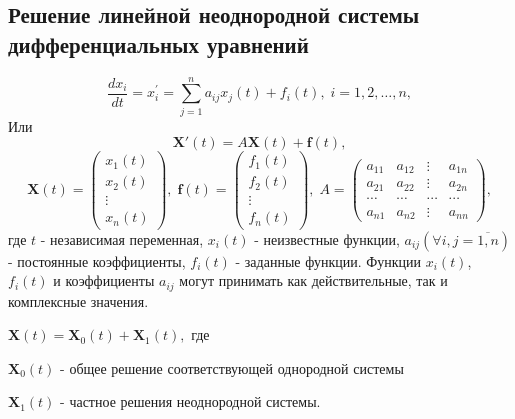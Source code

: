 \documentclass[a5paper,10pt]{article}
\begin{document}
		\subsection{Решение линейной неоднородной системы дифференциальных уравнений}
			$$ \frac{dx_i}{dt} = x^{\prime}_i = \sum\limits_{j=1}^n a_{ij}x_j(t) + f_i(t), \; i = 1,2,\ldots,n, $$
			Или
			$$ \mathbf{X}'\left( t \right) = A\mathbf{X}\left( t \right) + \mathbf{f}\left( t \right), $$
			\begin{equation}
				\mathbf{X}\left( t \right) = \left(
					\begin{array}{*{20}{c}}
						{{x_1}\left( t \right)}\\
						{{x_2}\left( t \right)}\\
						 \vdots \\
						{{x_n}\left( t \right)}
					\end{array}
				\right), \;
				\mathbf{f}\left( t \right) = \left(
					\begin{array}{*{20}{c}}
						{{f_1}\left( t \right)}\\
						{{f_2}\left( t \right)}\\
						 \vdots \\
						{{f_n}\left( t \right)}
					\end{array}
				\right), \;
				A = \left(
					\begin{array}{*{20}{c}}
						{{a_{11}}}&{{a_{12}}}& \vdots &{{a_{1n}}}\\
						{{a_{21}}}&{{a_{22}}}& \vdots &{{a_{2n}}}\\
						 \cdots & \cdots & \cdots & \cdots \\
						{{a_{n1}}}&{{a_{n2}}}& \vdots &{{a_{nn}}}
					\end{array}
				\right),
			\end{equation}
			где $t$ - независимая переменная, $x_i(t)$ - неизвестные функции, $a_{ij}(\forall i,j=\overline{1,n})$ - постоянные коэффициенты, $f_i(t)$ - заданные функции. Функции $x_i(t)$, $f_i(t)$ и коэффициенты $a_{ij}$ могут принимать как действительные, так и комплексные значения. 
			\begin{framed}
				$ \mathbf{X}\left( t \right) = {\mathbf{X}_0}\left( t \right) + {\mathbf{X}_1}\left( t \right),$ где \par
				$ \mathbf{X}_0(t) $ - общее решение соответствующей однородной системы \par
				$ \mathbf{X}_1(t) $ - частное решения неоднородной системы.
			\end{framed}
\end{document}
